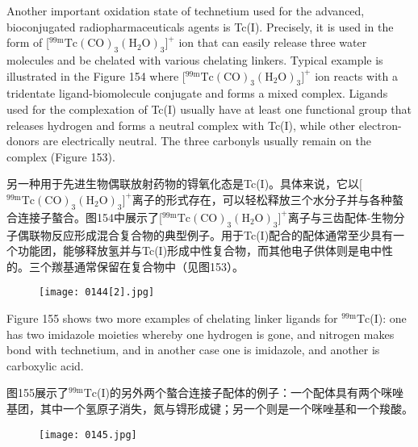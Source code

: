 \documentclass[dvipsnames, svgnames,a4paper,11pt]{article}
\begin{document}
Another important oxidation state of technetium used for the advanced,
bioconjugated radiopharmaceuticals agents is Tc(I). Precisely, it is used in the form
of [${}^\mathrm{99m}\mathrm{Tc(CO)_3(H_2O)_3]^+}$ ion that can easily release three water molecules and be
chelated with various chelating linkers. Typical example is illustrated in the Figure
154 where [${}^\mathrm{99m}\mathrm{Tc(CO)_3(H_2O)_3]^+}$ ion reacts with a tridentate ligand-biomolecule
conjugate and forms a mixed complex. Ligands used for the complexation of Tc(I)
usually have at least one functional group that releases hydrogen and forms a
neutral complex with Tc(I), while other electron-donors are electrically neutral. The
three carbonyls usually remain on the complex (Figure 153).

另一种用于先进生物偶联放射药物的锝氧化态是Tc(I)。具体来说，它以[${}^\mathrm{99m}\mathrm{Tc(CO)_3(H_2O)_3]^+}$离子的形式存在，可以轻松释放三个水分子并与各种螯合连接子螯合。图154中展示了[${}^\mathrm{99m}\mathrm{Tc(CO)_3(H_2O)_3]^+}$离子与三齿配体-生物分子偶联物反应形成混合复合物的典型例子。用于Tc(I)配合的配体通常至少具有一个功能团，能够释放氢并与Tc(I)形成中性复合物，而其他电子供体则是电中性的。三个羰基通常保留在复合物中（见图153）。

\begin{figure}[h]
	\centering
    \texttt{[image: 0144[2].jpg]}    
     \label{fig154}
\end{figure}

Figure 155 shows two more examples of chelating linker ligands for ${}^\mathrm{99m}\mathrm{Tc}$(I): one has
two imidazole moieties whereby one hydrogen is gone, and nitrogen makes bond
with technetium, and in another case one is imidazole, and another is carboxylic acid.

图155展示了${}^\mathrm{99m}\mathrm{Tc}$(I)的另外两个螯合连接子配体的例子：一个配体具有两个咪唑基团，其中一个氢原子消失，氮与锝形成键；另一个则是一个咪唑基和一个羧酸。

\begin{figure}[h]
	\centering
    \texttt{[image: 0145.jpg]}    
     \label{fig155}
\end{figure}
\end{document}
